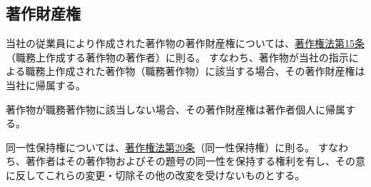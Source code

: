 \subsection{著作財産権}
当社の従業員により作成された著作物の著作財産権については、\href{https://elaws.e-gov.go.jp/document?lawid=345AC0000000048#Mp-At_15}{著作権法第15条}（職務上作成する著作物の著作者）\cite{onoline:eGovCopyrightLaw}に則る。
すなわち、著作物が当社の指示による職務上作成された著作物（職務著作物）に該当する場合、その著作財産権は当社に帰属する。

著作物が職務著作物に該当しない場合、その著作財産権は著作者個人に帰属する。



同一性保持権については、\href{https://elaws.e-gov.go.jp/document?lawid=345AC0000000048\#Mp-At_20}{著作権法第20条}（同一性保持権）に則る。
すなわち、著作者はその著作物およびその題号の同一性を保持する権利を有し、その意に反してこれらの変更・切除その他の改変を受けないものとする。


